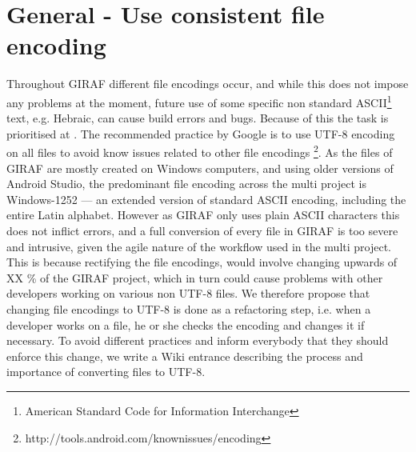 \section{General - Use consistent file encoding}
Throughout GIRAF different file encodings occur, and while this does not impose any problems at the moment, future use of some specific non standard ASCII\footnote{American Standard Code for Information Interchange} text, e.g. Hebraic, can cause build errors and bugs.
Because of this the task is prioritised at \phigh.
The recommended practice by Google is to use UTF-8 encoding on all files to avoid know issues related to other file encodings \footnote{http://tools.android.com/knownissues/encoding}.
As the files of GIRAF are mostly created on Windows computers, and using older versions of Android Studio, the predominant file encoding across the multi project is Windows-1252 --- an extended version of standard ASCII encoding, including the entire Latin alphabet.
However as GIRAF only uses plain ASCII characters this does not inflict errors, and a full conversion of every file in GIRAF is too severe and intrusive, given the agile nature of the workflow used in the multi project.
This is because rectifying the file encodings, would involve changing upwards of XX \% of the GIRAF project, which in turn could cause problems with other developers working on various non UTF-8 files.
We therefore propose that changing file encodings to UTF-8 is done as a refactoring step, i.e. when a developer works on a file, he or she checks the encoding and changes it if necessary.
To avoid different practices and inform everybody that they should enforce this change, we write a Wiki entrance describing the process and importance of converting files to UTF-8.
